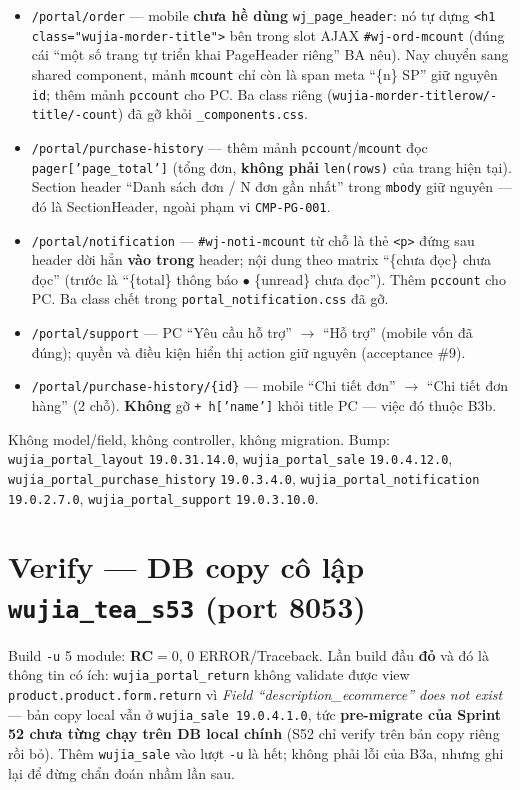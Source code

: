 \begin{itemize}
\item \texttt{/portal/order} --- mobile \textbf{chưa hề dùng} \texttt{wj\_page\_header}: nó tự
  dựng \texttt{<h1 class="wujia-morder-title">} bên trong slot AJAX \texttt{\#wj-ord-mcount}
  (đúng cái ``một số trang tự triển khai PageHeader riêng'' BA nêu). Nay chuyển sang shared
  component, mảnh \texttt{mcount} chỉ còn là span meta ``\{n\} SP'' giữ nguyên \texttt{id};
  thêm mảnh \texttt{pccount} cho PC. Ba class riêng
  (\texttt{wujia-morder-titlerow/-title/-count}) đã gỡ khỏi \texttt{\_components.css}.
\item \texttt{/portal/purchase-history} --- thêm mảnh \texttt{pccount}/\texttt{mcount} đọc
  \texttt{pager['page\_total']} (tổng đơn, \textbf{không phải} \texttt{len(rows)} của trang
  hiện tại). Section header ``Danh sách đơn / N đơn gần nhất'' trong \texttt{mbody} giữ nguyên
  --- đó là SectionHeader, ngoài phạm vi \texttt{CMP-PG-001}.
\item \texttt{/portal/notification} --- \texttt{\#wj-noti-mcount} từ chỗ là thẻ \texttt{<p>}
  đứng sau header dời hẳn \textbf{vào trong} header; nội dung theo matrix
  ``\{chưa đọc\} chưa đọc'' (trước là ``\{total\} thông báo $\bullet$ \{unread\} chưa đọc'').
  Thêm \texttt{pccount} cho PC. Ba class chết trong \texttt{portal\_notification.css} đã gỡ.
\item \texttt{/portal/support} --- PC ``Yêu cầu hỗ trợ'' $\rightarrow$ ``Hỗ trợ'' (mobile vốn
  đã đúng); quyền và điều kiện hiển thị action giữ nguyên (acceptance \#9).
\item \texttt{/portal/purchase-history/\{id\}} --- mobile ``Chi tiết đơn''
  $\rightarrow$ ``Chi tiết đơn hàng'' (2 chỗ). \textbf{Không} gỡ \texttt{+ h['name']} khỏi
  title PC --- việc đó thuộc B3b.
\end{itemize}

Không model/field, không controller, không migration. Bump: \texttt{wujia\_portal\_layout}
\texttt{19.0.31.14.0}, \texttt{wujia\_portal\_sale} \texttt{19.0.4.12.0},
\texttt{wujia\_portal\_purchase\_history} \texttt{19.0.3.4.0},
\texttt{wujia\_portal\_notification} \texttt{19.0.2.7.0}, \texttt{wujia\_portal\_support}
\texttt{19.0.3.10.0}.

\section{Verify --- DB copy cô lập \texttt{wujia\_tea\_s53} (port 8053)}

Build \texttt{-u} 5 module: \textbf{RC$=0$}, 0 ERROR/Traceback. Lần build đầu \textbf{đỏ} và đó
là thông tin có ích: \texttt{wujia\_portal\_return} không validate được view
\texttt{product.product.form.return} vì \emph{Field ``description\_ecommerce'' does not exist}
--- bản copy local vẫn ở \texttt{wujia\_sale 19.0.4.1.0}, tức \textbf{pre-migrate của Sprint 52
chưa từng chạy trên DB local chính} (S52 chỉ verify trên bản copy riêng rồi bỏ). Thêm
\texttt{wujia\_sale} vào lượt \texttt{-u} là hết; không phải lỗi của B3a, nhưng ghi lại để
đừng chẩn đoán nhầm lần sau.

